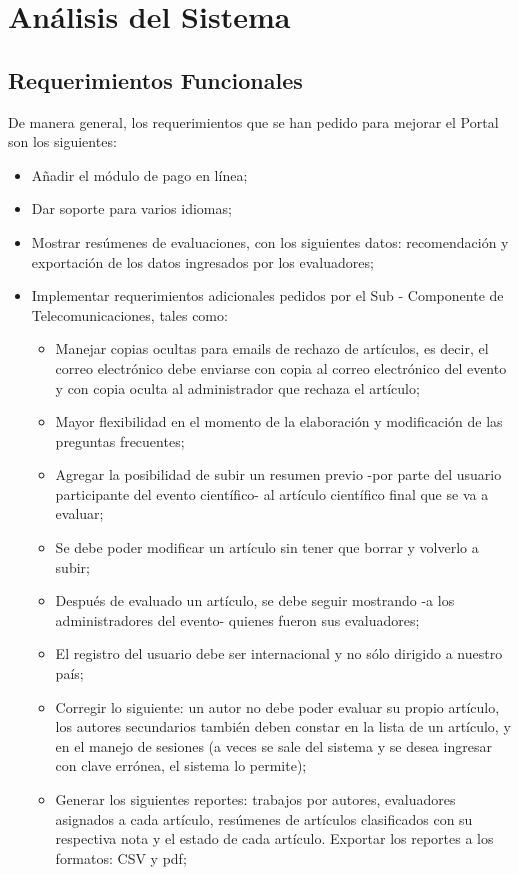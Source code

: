 \chapter{An\'alisis del Sistema}
\section{Requerimientos Funcionales}
\begin{indentar}
De manera general, los requerimientos que se han pedido para mejorar el Portal son los siguientes:
\begin{itemize}
\item A\~nadir el m\'odulo de pago en l\'inea;
\item Dar soporte para varios idiomas;
\item Mostrar res\'umenes de evaluaciones, con los siguientes datos: recomendaci\'on y exportaci\'on de los datos ingresados por los evaluadores;
\item Implementar requerimientos adicionales pedidos por el Sub - Componente de Telecomunicaciones, tales como:
	\begin{itemize}
	\item Manejar copias ocultas para emails de rechazo de art\'iculos, es decir, el correo electr\'onico debe enviarse con copia al correo electr\'onico del evento y con copia oculta al administrador que rechaza el art\'iculo;
	\item Mayor flexibilidad en el momento de la elaboraci\'on y modificaci\'on de las preguntas frecuentes;
	\item Agregar la posibilidad de subir un resumen previo -por parte del usuario participante del evento cient\'ifico- al art\'iculo cient\'ifico final  que se va a evaluar;
	\item Se debe poder modificar un art\'iculo sin tener que borrar y volverlo a subir;
	\item Despu\'es de evaluado un art\'iculo, se debe seguir mostrando -a los administradores del evento- quienes fueron sus evaluadores;
	\item El registro del usuario debe ser internacional y no s\'olo dirigido a nuestro pa\'is;
	\item Corregir lo siguiente: un autor no debe poder evaluar su propio art\'iculo, los autores secundarios tambi\'en deben constar en la lista de un art\'iculo, y en el manejo de sesiones (a veces se sale del sistema y se desea ingresar con clave err\'onea, el sistema lo permite);
	\item Generar los siguientes reportes: trabajos por autores, evaluadores asignados a cada art\'iculo, res\'umenes de art\'iculos clasificados con su respectiva nota y el estado de cada art\'iculo. Exportar los reportes a los formatos: CSV y pdf;

\end{itemize}
\end{itemize}
\end{indentar}
